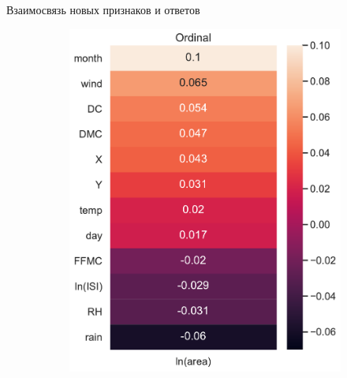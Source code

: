 \documentclass{beamer} %
\begin{document}
\begin{frame}{Взаимосвязь новых признаков и ответов}
\begin{figure}
\begin{subfigure}[b]{0.475\textwidth}
                \includegraphics[width=\textwidth]{features_corr_1.pdf}
            \end{subfigure}
        \end{figure}
    \end{frame}
\end{document}
